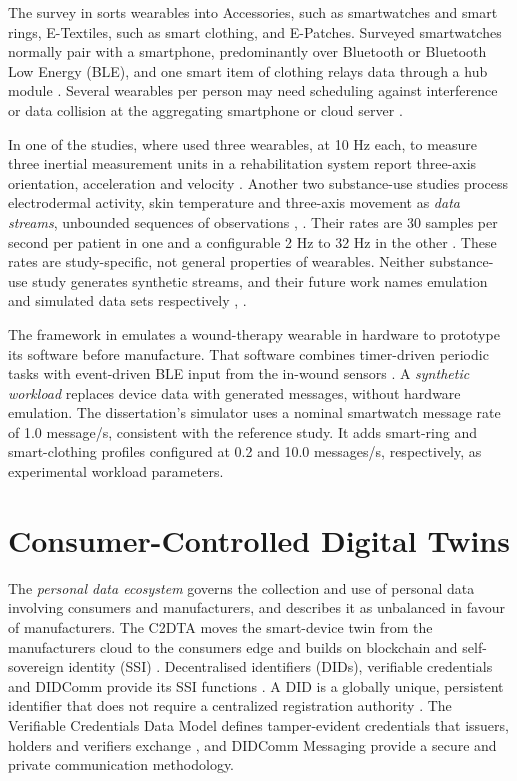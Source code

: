 \noindent The survey in \cite{word03} sorts wearables into Accessories, such as smartwatches and smart rings, E-Textiles, such as smart clothing, and E-Patches. Surveyed smartwatches normally pair with a smartphone, predominantly over Bluetooth or Bluetooth Low Energy (BLE), and one smart item of clothing relays data through a hub module \cite{word03}. Several wearables per person may need scheduling against interference or data collision at the aggregating smartphone or cloud server \cite{word03}.

In one of the studies, where used three wearables, at 10 Hz each, to measure three inertial measurement units in a rehabilitation system report three-axis orientation, acceleration and velocity \cite{word19}. Another two substance-use studies process electrodermal activity, skin temperature and three-axis movement as \emph{data streams}, unbounded sequences of observations \cite{word20} , \cite{word21}. Their rates are 30 samples per second per patient in one \cite{word20} and a configurable 2 Hz to 32 Hz in the other \cite{word21}. These rates are study-specific, not general properties of wearables. Neither substance-use study generates synthetic streams, and their future work names emulation and simulated data sets respectively \cite{word20}, \cite{word21} .

The framework in \cite{word22} emulates a wound-therapy wearable in hardware to prototype its software before manufacture. That software combines timer-driven periodic tasks with event-driven BLE input from the in-wound sensors \cite{word22}. A \emph{synthetic workload} replaces device data with generated messages, without hardware emulation. The dissertation's simulator uses a nominal smartwatch message rate of 1.0 message/s, consistent with the reference study. It adds smart-ring and smart-clothing profiles configured at 0.2 and 10.0 messages/s, respectively, as experimental workload parameters.

\section{Consumer-Controlled Digital Twins}\label{consumer-controlled-digital-twins}

\noindent The \emph{personal data ecosystem} governs the collection and use of personal data involving consumers and manufacturers, and \cite{word06} describes it as unbalanced in favour of manufacturers. The C2DTA moves the smart-device twin from the manufacturer\textquotesingle s cloud to the consumer\textquotesingle s edge and builds on blockchain and self-sovereign identity (SSI) \cite{word06}. Decentralised identifiers (DIDs), verifiable credentials and DIDComm provide its SSI functions \cite{word06}. A DID is a globally unique, persistent identifier that does not require a centralized registration authority \cite{word23}. The Verifiable Credentials Data Model defines tamper-evident credentials that issuers, holders and verifiers exchange \cite{word24}, and DIDComm Messaging provide a secure and private communication methodology\cite{word25}.


